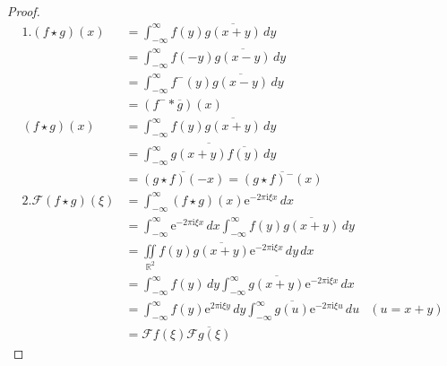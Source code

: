 \documentclass{ctexbook}
\begin{document}
\begin{proof}
\begin{align*}
    1.(f\star g)(x)               & =\int_{-\infty}^{\infty}f(y)\overline{g(x+y)}\,dy                                                                   \\
                                  & =\int_{-\infty}^{\infty}f(-y)\overline{g(x-y)}\,dy                                                                  \\
                                  & =\int_{-\infty}^{\infty}f^-(y)\overline{g(x-y)}\,dy                                                                  \\
                                  & = (f^- * \overline{g})(x)                                                                                           \\
    (f\star g)(x)                 & =\int_{-\infty}^{\infty}f(y)\overline{g(x+y)}\,dy                                                                   \\
                                  & =\overline{\int_{-\infty}^{\infty}g(x+y)\overline{f(y)}\,dy}                                                        \\
                                  & =\overline{(g\star f)(-x)}=\overline{(g\star f)^-(x)}                                                               \\
    2.\mathcal{F} (f\star g)(\xi) & =\int_{-\infty}^{\infty}(f\star g)(x)\mathrm{e}^{-2\pi \mathrm{i}\xi x}\,dx                                                           \\
                                  & =\int_{-\infty}^{\infty}\mathrm{e}^{-2\pi \mathrm{i}\xi x}\,dx\int_{-\infty}^{\infty}f(y)\overline{g(x+y)}\,dy                        \\
                                  & =\iint\limits_{\mathbb{R}^2}f(y)\overline{g(x+y)}\mathrm{e}^{-2\pi \mathrm{i}\xi x}\,dy\,dx                                           \\
                                  & =\int_{-\infty}^{\infty}f(y)\,dy\int_{-\infty}^{\infty}\overline{g(x+y)}\mathrm{e}^{-2\pi \mathrm{i}\xi x}\,dx                        \\
                                  & =\int_{-\infty}^{\infty}f(y)\mathrm{e}^{2\pi \mathrm{i}\xi y}\,dy\int_{-\infty}^{\infty}\overline{g(u)}\mathrm{e}^{-2\pi \mathrm{i}\xi u}\,du & (u=x+y) \\
                                  & =\mathcal{F} f(\xi)\overline{\mathcal{F} g(\xi)}

\end{align*}
\end{proof}
\end{document}
